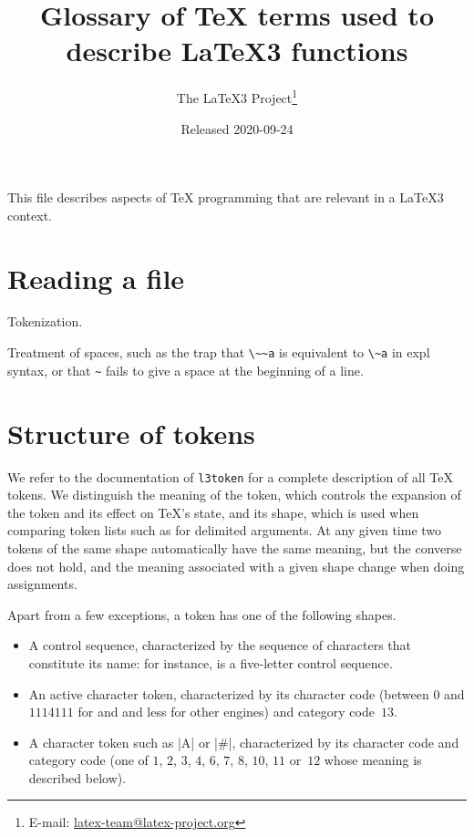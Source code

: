 \documentclass{l3doc}
\title{%
  Glossary of \TeX{} terms used to describe \LaTeX3 functions%
}
\author{%
  The \LaTeX3 Project\thanks
    {%
      E-mail:
      \href{mailto:latex-team@latex-project.org}%
        {latex-team@latex-project.org}%
    }%
}
\date{Released 2020-09-24}
\begin{document}
\maketitle

This file describes aspects of \TeX{} programming that are relevant in a
\LaTeX3 context.

\section{Reading a file}

Tokenization.

Treatment of spaces, such as the trap that \verb|\~~a| is equivalent to
\verb|\~a| in expl syntax, or that \verb|~| fails to give a space at the
beginning of a line.

\section{Structure of tokens}

We refer to the documentation of \texttt{l3token} for a complete
description of all \TeX{} tokens.  We distinguish the meaning of the
token, which controls the expansion of the token and its effect on
\TeX{}'s state, and its shape, which is used when comparing token lists
such as for delimited arguments.  At any given time two tokens of the
same shape automatically have the same meaning, but the converse does
not hold, and the meaning associated with a given shape change when
doing assignments.

Apart from a few exceptions, a token has one of the following shapes.
\begin{itemize}
  \item A control sequence, characterized by the sequence of characters
    that constitute its name: for instance,  is a five-letter
    control sequence.
  \item An active character token, characterized by its character code
    (between $0$ and $1114111$ for \LuaTeX{} and \XeTeX{} and less for
    other engines) and category code~$13$.
  \item A character token such as |A| or |#|, characterized by its
    character code and category code (one of $1$, $2$, $3$, $4$, $6$,
    $7$, $8$, $10$, $11$ or~$12$ whose meaning is described below).
\end{itemize}
\end{document}

